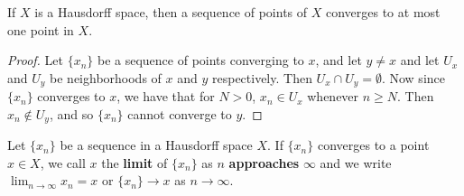 \begin{theorem}\label{1.6.11}
    If $X$ is a Hausdorff space, then a sequence of points of  $X$ converges to
    at most one point in  $X$.
\end{theorem}
\begin{proof}
    Let $\{x_n\}$ be a sequence of points converging to $x$, and let  $y \neq x$
    and let  $U_x$ and  $U_y$ be neighborhoods of  $x$ and  $y$ respectively.
    Then $U_x \cap U_y = \emptyset$. Now since  $\{x_n\}$ converges to  $x$, we
    have that for $N>0$, $x_n \in U_x$ whenever $n \geq N$. Then $x_n \notin
    U_y$, and so  $\{x_n\}$ cannot converge to  $y$.
\end{proof}

\begin{definition}
    Let $\{x_n\}$ be a sequence in a Hausdorff space  $X$. If  $\{x_n\}$
    converges to a point $x \in X$, we call  $x$ the \textbf{limit} of
    $\{x_n\}$ as $n$  \textbf{approaches} $\infty$ and we write $\lim_{n
    \rightarrow \infty}{x_n}=x$ or $\{x_n\} \rightarrow x$ as $n \rightarrow
    \infty$.
\end{definition}

